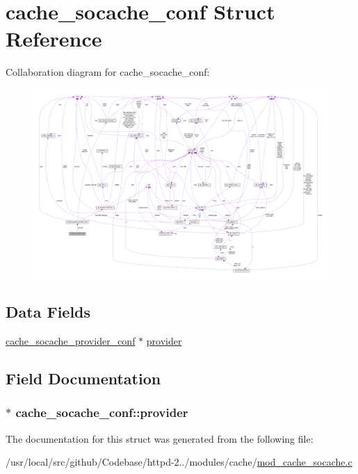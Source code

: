 \hypertarget{structcache__socache__conf}{}\section{cache\+\_\+socache\+\_\+conf Struct Reference}
\label{structcache__socache__conf}


Collaboration diagram for cache\+\_\+socache\+\_\+conf\+:
\nopagebreak
\begin{figure}[H]
\begin{center}
\leavevmode
\includegraphics[width=350pt]{structcache__socache__conf__coll__graph}
\end{center}
\end{figure}
\subsection*{Data Fields}
\begin{DoxyCompactItemize}
\item 
\hyperlink{structcache__socache__provider__conf}{cache\+\_\+socache\+\_\+provider\+\_\+conf} $\ast$ \hyperlink{structcache__socache__conf_ae620fdd812daf8b143387d1c567bf112}{provider}
\end{DoxyCompactItemize}


\subsection{Field Documentation}
\subsubsection[{\texorpdfstring{provider}{provider}}]{$\ast$ cache\+\_\+socache\+\_\+conf\+::provider}\hypertarget{structcache__socache__conf_ae620fdd812daf8b143387d1c567bf112}{}\label{structcache__socache__conf_ae620fdd812daf8b143387d1c567bf112}


The documentation for this struct was generated from the following file\+:\begin{DoxyCompactItemize}
\item 
/usr/local/src/github/\+Codebase/httpd-\/2../modules/cache/\hyperlink{modules_2cache_2mod__cache__socache_8c}{mod\+\_\+cache\+\_\+socache.\+c}\end{DoxyCompactItemize}
